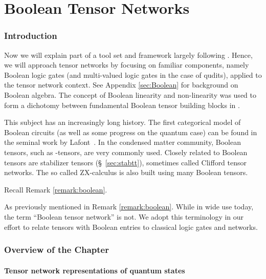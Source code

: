 \part{Boolean Tensor Networks}\label{sec:btn}
\section{Introduction}


Now we will explain part of a tool set and framework largely following \cite{CTNS, BB11}.   Hence, we will approach tensor networks by focusing on familiar components, namely Boolean logic gates (and
multi-valued logic gates in the case of qudits), applied to the tensor network context. See Appendix \ref{sec:Boolean} for background on Boolean algebra.  The concept of Boolean linearity and non-linearity was used to form a dichotomy between fundamental Boolean tensor building blocks in \cite{CTNS}. 

This subject has an increasingly long history.  The first categorical model of Boolean circuits (as well as some progress on the quantum case) can be found in the seminal work by Lafont~\cite{boolean03}.  In the condensed matter community, Boolean tensors, such as \COPY{}-tensors, are very commonly used.  Closely related to Boolean tensors are stabilizer tensors (\S~\ref{sec:stabtt}), sometimes called Clifford tensor networks.  The so called ZX-calculus \cite{CD, Coecke2017} is also built using many Boolean tensors.  

Recall Remark \ref{remark:boolean}.  

\begin{remark}\label{remark:boolean2}
As previously mentioned in Remark \ref{remark:boolean}.  While in wide use today, the term ``Boolean tensor network'' is not.  We adopt this terminology in our effort to relate tensors with Boolean entries to classical logic gates and networks.  
\end{remark}



\section{Overview of the Chapter}\label{sec:overview}

\subsection*{Tensor network representations of quantum states}\label{sec:newrep}

